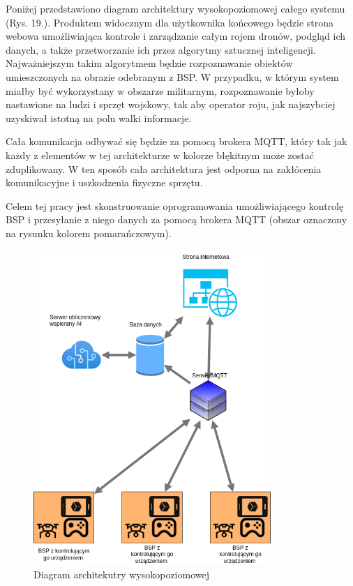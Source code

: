Poniżej przedstawiono diagram architektury wysokopoziomowej całego systemu (Rys. 19.). Produktem widocznym dla użytkownika końcowego będzie strona webowa umożliwiająca kontrole i zarządzanie całym rojem dronów, podgląd ich danych, a także przetworzanie ich przez algorytmy sztucznej inteligencji. Najważniejszym takim algorytmem będzie rozpoznawanie obiektów umieszczonych na obrazie odebranym z BSP. W przypadku, w którym system miałby być wykorzystany w obszarze militarnym, rozpoznawanie byłoby nastawione na ludzi i sprzęt wojskowy, tak aby operator roju, jak najszybciej uzyskiwał istotną na polu walki informacje.

Cała komunikacja odbywać się będzie za pomocą brokera MQTT, który tak jak każdy z elementów w tej architekturze w kolorze błękitnym może zostać zduplikowany. W ten sposób cała architektura jest odporna na zakłócenia komunikacyjne i uszkodzenia fizyczne sprzętu.

Celem tej pracy jest skonstruowanie oprogramowania umożliwiającego kontrolę BSP i przesyłanie z niego danych za pomocą brokera MQTT (obszar oznaczony na rysunku kolorem pomarańczowym).


\begin{figure}[!ht]
  \centering
  \includegraphics[width=9cm]{./Obrazy/highlevel.png}
  \caption{Diagram architekutry wysokopoziomowej}
  \end{figure}

\newpage
